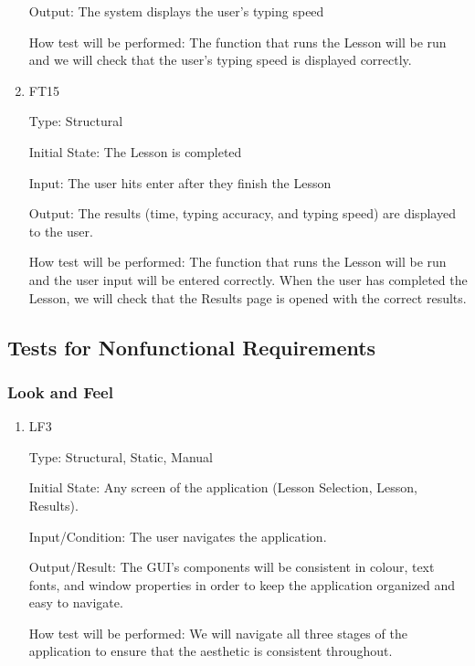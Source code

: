 \documentclass[12pt, titlepage]{article}
\begin{document}
\begin{enumerate}
Output: The system displays the user's typing speed
					
How test will be performed:  The function that runs the Lesson will be run and we will check that the user's typing speed is displayed correctly.  

\item{{\color{cyan}FT15}\\}
{\color{cyan}
Type: Structural
					
Initial State: The Lesson is completed
					
Input: The user hits enter after they finish the Lesson
					
Output: The results (time, typing accuracy, and typing speed) are displayed to the user.
		
How test will be performed: The function that runs the Lesson will be run and the user input will be entered correctly. When the user has completed the Lesson, we will check that the Results page is opened with the correct results.}

\end{enumerate}

\subsection{Tests for Nonfunctional Requirements}

\subsubsection{Look and Feel}

\begin{enumerate}

\item{{\color{cyan}LF3}}

Type: Structural, Static, Manual
					
Initial State: Any screen of the application (Lesson Selection, Lesson, Results).
					
Input/Condition: The user navigates the application.
					
Output/Result: The GUI's components will be consistent in colour, text fonts, and window properties in order to keep the application organized and easy to navigate.
					
How test will be performed: We will navigate all three stages of the application to ensure that the aesthetic is consistent throughout.

\end{enumerate}
\end{document}
